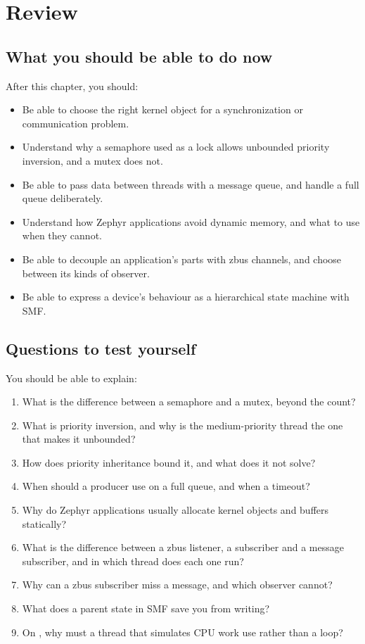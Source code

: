 
\section{Review}
\label{c4:sec:review}

\subsection*{What you should be able to do now}
After this chapter, you should:

\begin{itemize}
  \item Be able to choose the right kernel object for a synchronization or communication problem.
  \item Understand why a semaphore used as a lock allows unbounded priority inversion, and a mutex does not.
  \item Be able to pass data between threads with a message queue, and handle a full queue deliberately.
  \item Understand how Zephyr applications avoid dynamic memory, and what to use when they cannot.
  \item Be able to decouple an application’s parts with zbus channels, and choose between its kinds of
    observer.
  \item Be able to express a device’s behaviour as a hierarchical state machine with SMF.
\end{itemize}

\subsection*{Questions to test yourself}
You should be able to explain:

\begin{enumerate}
  \item What is the difference between a semaphore and a mutex, beyond the count?
  \item What is priority inversion, and why is the medium-priority thread the one that makes it unbounded?
  \item How does priority inheritance bound it, and what does it not solve?
  \item When should a producer use  on a full queue, and when a timeout?
  \item Why do Zephyr applications usually allocate kernel objects and buffers statically?
  \item What is the difference between a zbus listener, a subscriber and a message subscriber, and in which
    thread does each one run?
  \item Why can a zbus subscriber miss a message, and which observer cannot?
  \item What does a parent state in SMF save you from writing?
  \item On , why must a thread that simulates CPU work use  rather than
    a loop?
\end{enumerate}

